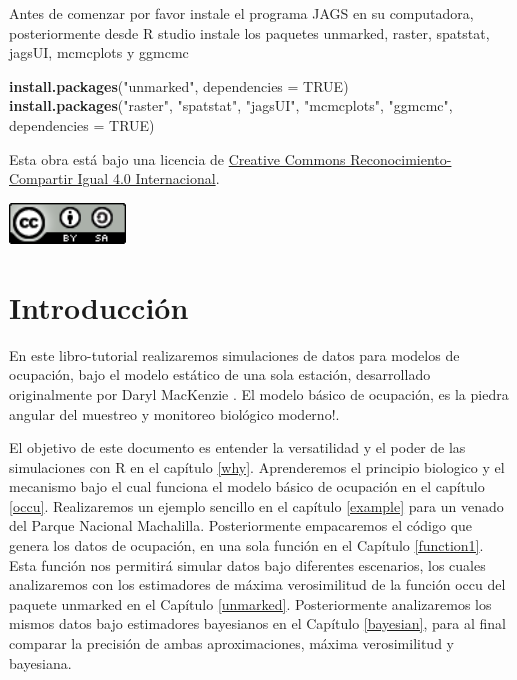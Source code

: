 \documentclass[
]{book}
\newenvironment{Shaded}{\begin{snugshade}}{\end{snugshade}}
\newcommand{\DataTypeTok}[1]{\textcolor[rgb]{0.13,0.29,0.53}{#1}}
\newcommand{\KeywordTok}[1]{\textcolor[rgb]{0.13,0.29,0.53}{\textbf{#1}}}
\newcommand{\NormalTok}[1]{#1}
\newcommand{\OtherTok}[1]{\textcolor[rgb]{0.56,0.35,0.01}{#1}}
\newcommand{\StringTok}[1]{\textcolor[rgb]{0.31,0.60,0.02}{#1}}
\begin{document}
Antes de comenzar por favor instale el programa JAGS en su computadora, posteriormente desde R studio instale los paquetes unmarked, raster, spatstat, jagsUI, mcmcplots y ggmcmc

\begin{Shaded}
\begin{Highlighting}[]
\KeywordTok{install.packages}\NormalTok{(}\StringTok{"unmarked"}\NormalTok{, }\DataTypeTok{dependencies =} \OtherTok{TRUE}\NormalTok{)}
\KeywordTok{install.packages}\NormalTok{(}\StringTok{"raster"}\NormalTok{, }\StringTok{"spatstat"}\NormalTok{, }\StringTok{"jagsUI"}\NormalTok{, }\StringTok{"mcmcplots"}\NormalTok{, }\StringTok{"ggmcmc"}\NormalTok{, }\DataTypeTok{dependencies =} \OtherTok{TRUE}\NormalTok{)}
\end{Highlighting}
\end{Shaded}

Esta obra está bajo una licencia de \href{https://creativecommons.org/licenses/by-sa/4.0/deed.es}{Creative Commons Reconocimiento-Compartir Igual 4.0 Internacional}.

\begin{flushleft}\includegraphics[width=1.22in]{images/by-sa-88x31} \end{flushleft}

\hypertarget{intro}{%
\chapter{Introducción}\label{intro}}

En este libro-tutorial realizaremos simulaciones de datos para modelos de ocupación, bajo el modelo estático de una sola estación, desarrollado originalmente por Daryl MacKenzie \citep{MacKenzie2002}. El modelo básico de ocupación, es la piedra angular del muestreo y monitoreo biológico moderno!.

El objetivo de este documento es entender la versatilidad y el poder de las simulaciones con R en el capítulo \ref{why}. Aprenderemos el principio biologico y el mecanismo bajo el cual funciona el modelo básico de ocupación en el capítulo \ref{occu}. Realizaremos un ejemplo sencillo en el capítulo \ref{example} para un venado del Parque Nacional Machalilla. Posteriormente empacaremos el código que genera los datos de ocupación, en una sola función en el Capítulo \ref{function1}. Esta función nos permitirá simular datos bajo diferentes escenarios, los cuales analizaremos con los estimadores de máxima verosimilitud de la función occu del paquete unmarked en el Capítulo \ref{unmarked}. Posteriormente analizaremos los mismos datos bajo estimadores bayesianos en el Capítulo \ref{bayesian}, para al final comparar la precisión de ambas aproximaciones, máxima verosimilitud y bayesiana.
\end{document}
